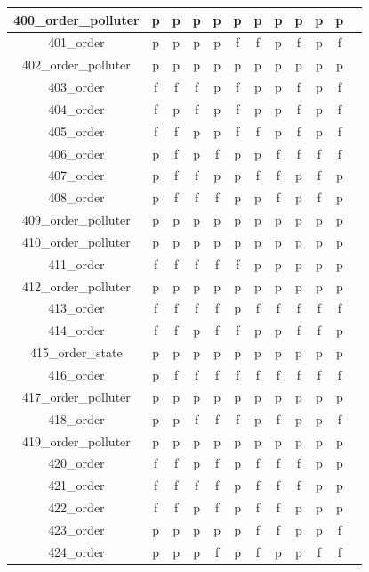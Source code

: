 \documentclass[
fancyheadings, %
%
%
]{stsreprt}
\begin{document}
\begin{longtable}{|c|c|c|c|c|c|c|c|c|c|c|c|}
400\_order\_polluter & p & p & p & p & p & p & p & p & p & p \\
\hline
401\_order & p & p & p & p & f & f & p & f & p & f \\
\hline
402\_order\_polluter & p & p & p & p & p & p & p & p & p & p \\
\hline
403\_order & f & f & f & p & f & p & p & f & p & f \\
\hline
404\_order & f & p & f & p & f & p & p & f & p & f \\
\hline
405\_order & f & f & p & p & f & f & p & f & p & f \\
\hline
406\_order & p & f & p & f & p & p & f & f & f & f \\
\hline
407\_order & p & f & f & p & p & f & f & p & f & p \\
\hline
408\_order & p & f & f & f & p & p & f & p & f & p \\
\hline
409\_order\_polluter & p & p & p & p & p & p & p & p & p & p \\
\hline
410\_order\_polluter & p & p & p & p & p & p & p & p & p & p \\
\hline
411\_order & f & f & f & f & f & p & p & p & p & p \\
\hline
412\_order\_polluter & p & p & p & p & p & p & p & p & p & p \\
\hline
413\_order & f & f & f & f & p & f & f & f & f & f \\
\hline
414\_order & f & f & p & f & f & p & p & f & f & p \\
\hline
415\_order\_state & p & p & p & p & p & p & p & p & p & p \\
\hline
416\_order & p & f & f & f & f & f & f & f & f & f \\
\hline
417\_order\_polluter & p & p & p & p & p & p & p & p & p & p \\
\hline
418\_order & p & p & f & f & f & p & f & p & p & f \\
\hline
419\_order\_polluter & p & p & p & p & p & p & p & p & p & p \\
\hline
420\_order & f & f & p & f & p & f & f & f & p & p \\
\hline
421\_order & f & f & f & f & p & f & f & f & p & p \\
\hline
422\_order & f & f & p & f & p & f & f & p & p & p \\
\hline
423\_order & p & p & p & p & p & f & f & p & p & f \\
\hline
424\_order & p & p & p & f & p & f & p & p & f & f \\
\hline

\end{longtable}
\end{document}
